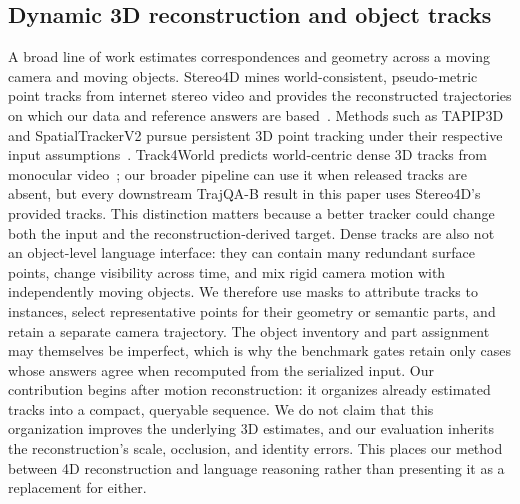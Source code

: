 \subsection{Dynamic 3D reconstruction and object tracks}
A broad line of work estimates correspondences and geometry across a moving camera and moving objects. Stereo4D mines world-consistent, pseudo-metric point tracks from internet stereo video and provides the reconstructed trajectories on which our data and reference answers are based~\citep{jinStereo4DLearningHow2025}. Methods such as TAPIP3D and SpatialTrackerV2 pursue persistent 3D point tracking under their respective input assumptions~\citep{zhangTAPIP3DTrackingAny2025,xiaoSpatialTrackerV23DPoint2025}. Track4World predicts world-centric dense 3D tracks from monocular video~\citep{luTrack4WorldFeedforwardWorldcentric2026}; our broader pipeline can use it when released tracks are absent, but every downstream TrajQA-B result in this paper uses Stereo4D's provided tracks. This distinction matters because a better tracker could change both the input and the reconstruction-derived target. Dense tracks are also not an object-level language interface: they can contain many redundant surface points, change visibility across time, and mix rigid camera motion with independently moving objects. We therefore use masks to attribute tracks to instances, select representative points for their geometry or semantic parts, and retain a separate camera trajectory. The object inventory and part assignment may themselves be imperfect, which is why the benchmark gates retain only cases whose answers agree when recomputed from the serialized input. Our contribution begins after motion reconstruction: it organizes already estimated tracks into a compact, queryable sequence. We do not claim that this organization improves the underlying 3D estimates, and our evaluation inherits the reconstruction's scale, occlusion, and identity errors. This places our method between 4D reconstruction and language reasoning rather than presenting it as a replacement for either.

